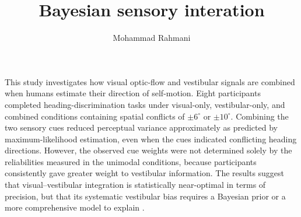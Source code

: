 \documentclass[a4paper]{article}
\title{Bayesian sensory interation}
\date{}
\author{Mohammad Rahmani}
\begin{document}
    \maketitle
    This study investigates how visual optic-flow and vestibular signals are combined when humans estimate their direction of self-motion. Eight participants completed heading-discrimination tasks under visual-only, vestibular-only, and combined conditions containing spatial conflicts of $\pm 6^{\circ}$ or $\pm 10^{\circ}$.
    Combining the two sensory cues reduced perceptual variance approximately as predicted by maximum-likelihood estimation, even when the cues indicated conflicting heading directions. However, the observed cue weights were not determined solely by the reliabilities measured in the unimodal conditions, because participants consistently gave greater weight to vestibular information. The results suggest that visual--vestibular integration is statistically near-optimal in terms of precision, but that its systematic vestibular bias requires a Bayesian prior or a more comprehensive model to explain \cite{butler-2010-bayesian-integration-of-visual-and-vestibular-signals-for-heading}.
    
    
\end{document}
